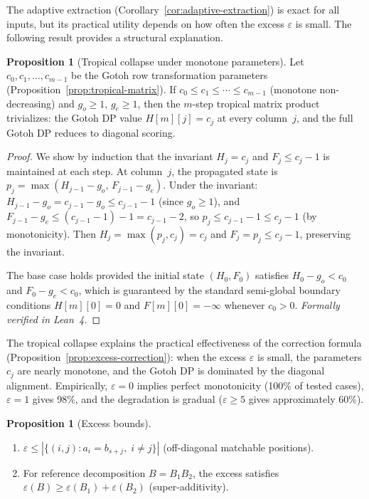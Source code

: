 \documentclass[11pt, a4paper]{article}
\theoremstyle{definition}
\newtheorem{proposition}[theorem]{Proposition}
\theoremstyle{remark}
\begin{document}
The adaptive extraction (Corollary~\ref{cor:adaptive-extraction}) is exact for all inputs, but its practical utility depends on how often the excess $\varepsilon$ is small.
The following result provides a structural explanation.

\begin{proposition}[Tropical collapse under monotone parameters]
\label{prop:tropical-collapse}
Let $c_0, c_1, \dots, c_{m-1}$ be the Gotoh row transformation
parameters (Proposition~\ref{prop:tropical-matrix}).
If
$c_0 \leq c_1 \leq \cdots \leq c_{m-1}$ (monotone
non-decreasing) and $g_o \geq 1$, $g_e \geq 1$, then the
$m$-step tropical matrix product trivializes: the Gotoh DP value
$H[m][j] = c_j$ at every column~$j$, and the full Gotoh DP
reduces to diagonal scoring.
\end{proposition}

\begin{proof}
We show by induction that the invariant $H_j = c_j$ and
$F_j \leq c_j - 1$ is maintained at each step.
At column~$j$,
the propagated state is
$p_j = \max(H_{j-1} - g_o,\, F_{j-1} - g_e)$.
Under the
invariant: $H_{j-1} - g_o = c_{j-1} - g_o \leq c_{j-1} - 1$
(since $g_o \geq 1$), and
$F_{j-1} - g_e \leq (c_{j-1} - 1) - 1 = c_{j-1} - 2$, so
$p_j \leq c_{j-1} - 1 \leq c_j - 1$ (by monotonicity).
Then $H_j = \max(p_j, c_j) = c_j$ and
$F_j = p_j \leq c_j - 1$, preserving the invariant.

The base case holds provided the initial state $(H_0, F_0)$
satisfies $H_0 - g_o < c_0$ and $F_0 - g_e < c_0$, which is
guaranteed by the standard semi-global boundary conditions
$H[m][0] = 0$ and $F[m][0] = -\infty$ whenever $c_0 > 0$.
\emph{Formally verified in Lean~4.}
\end{proof}

The tropical collapse explains the practical effectiveness of
the correction formula
(Proposition~\ref{prop:excess-correction}): when the excess
$\varepsilon$ is small, the parameters $c_j$ are nearly
monotone, and the Gotoh DP is dominated by the diagonal
alignment.
Empirically, $\varepsilon = 0$ implies perfect
monotonicity (100\% of tested cases), $\varepsilon = 1$
gives 98\%, and the degradation is gradual ($\varepsilon \geq 5$
gives approximately 60\%).

\begin{proposition}[Excess bounds]
\label{prop:excess-bounds}
\begin{enumerate}
  \item $\varepsilon \leq |\{(i, j) : a_i = b_{s+j},\; i \neq j\}|$
    (off-diagonal matchable positions).
  \item For reference decomposition $B = B_1 B_2$, the excess
    satisfies $\varepsilon(B) \geq \varepsilon(B_1) + \varepsilon(B_2)$
    (super-additivity).
\end{enumerate}
\end{proposition}
\end{document}
